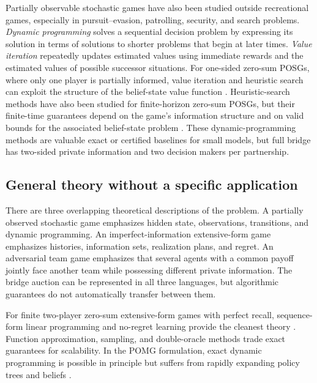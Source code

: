 \documentclass[11pt]{article}
\begin{document}
Partially observable stochastic games have also been studied outside recreational games, especially in pursuit--evasion, patrolling, security, and search problems. \emph{Dynamic programming} solves a sequential decision problem by expressing its solution in terms of solutions to shorter problems that begin at later times. \emph{Value iteration} repeatedly updates estimated values using immediate rewards and the estimated values of possible successor situations. For one-sided zero-sum POSGs, where only one player is partially informed, value iteration and heuristic search can exploit the structure of the belief-state value function \cite{horak2023onesided}. Heuristic-search methods have also been studied for finite-horizon zero-sum POSGs, but their finite-time guarantees depend on the game's information structure and on valid bounds for the associated belief-state problem \cite{delage2024hsvi}. These dynamic-programming methods are valuable exact or certified baselines for small models, but full bridge has two-sided private information and two decision makers per partnership.


\subsection{General theory without a specific application}

There are three overlapping theoretical descriptions of the problem. A partially observed stochastic game emphasizes hidden state, observations, transitions, and dynamic programming. An imperfect-information extensive-form game emphasizes histories, information sets, realization plans, and regret. An adversarial team game emphasizes that several agents with a common payoff jointly face another team while possessing different private information. The bridge auction can be represented in all three languages, but algorithmic guarantees do not automatically transfer between them.

For finite two-player zero-sum extensive-form games with perfect recall, sequence-form linear programming and no-regret learning provide the cleanest theory \cite{koller1996sequence,zinkevich2007regret}. Function approximation, sampling, and double-oracle methods trade exact guarantees for scalability. In the POMG formulation, exact dynamic programming is possible in principle but suffers from rapidly expanding policy trees and beliefs \cite{hansen2004dynamic}.
\end{document}
